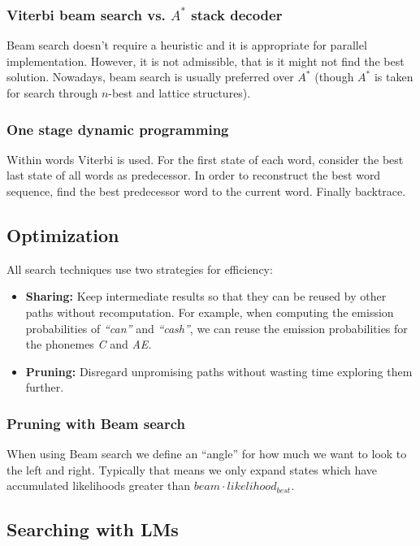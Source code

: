 \subsubsection{Viterbi beam search vs. $A^{\ast}$ stack decoder}
Beam search doesn't require a heuristic and it is appropriate for parallel implementation. However, it is not admissible, that is it might not find the best solution. Nowadays, beam search is usually preferred over $A^{\ast}$ (though $A^{\ast}$ is taken for search through $n$-best and lattice structures).

\subsubsection{One stage dynamic programming}
Within words Viterbi is used. For the first state of each word, consider the best last state of all words as predecessor. In order to reconstruct the best word sequence, find the best predecessor word to the current word. Finally backtrace.


\subsection{Optimization}

All search techniques use two strategies for efficiency:
\begin{itemize}
    \item \textbf{Sharing:} Keep intermediate results so that they can be reused by other paths without recomputation. For example, when computing the emission probabilities of \textit{``can''} and \textit{``cash''}, we can reuse the emission probabilities for the phonemes \textit{C} and \textit{AE}.
    \item \textbf{Pruning:} Disregard unpromising paths without wasting time exploring them further.
\end{itemize}

\subsubsection{Pruning with Beam search}
When using Beam search we define an ``angle'' for how much we want to look to the left and right. Typically that means we only expand states which have accumulated likelihoods greater than $beam \cdot likelihood_{best}$.

\subsection{Searching with LMs}

